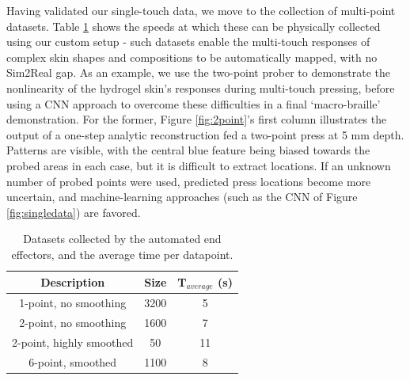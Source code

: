 Having validated our single-touch data, we move to the collection of multi-point datasets. Table \ref{tab:speeds} shows the speeds at which these can be physically collected using our custom setup - such datasets enable the multi-touch responses of complex skin shapes and compositions to be automatically mapped, with no Sim2Real gap. As an example, we use the two-point prober to demonstrate the nonlinearity of the hydrogel skin's responses during multi-touch pressing, before using a CNN approach to overcome these difficulties in a final `macro-braille' demonstration. For the former, Figure \ref{fig:2point}'s first column illustrates the output of a one-step analytic reconstruction fed a two-point press at 5 mm depth. Patterns are visible, with the central blue feature being biased towards the probed areas in each case, but it is difficult to extract locations. If an unknown number of probed points were used, predicted press locations become more uncertain, and machine-learning approaches (such as the CNN of Figure \ref{fig:singledata}) are favored.

\begin{table}[htbp]
    \centering
    \caption{Datasets collected by the automated end effectors, and the average time per datapoint.}
        \begin{tabular}{|c|c|c|}
        \hline
        \textbf{Description} & \textbf{Size} & \textbf{T$_{average}$ (s)} \\
        \hline
        1-point, no smoothing & 3200 & 5\\
        2-point, no smoothing & 1600 & 7\\
        2-point, highly smoothed & 50 & 11\\
        6-point, smoothed & 1100 & 8\\
        \hline
        \end{tabular}
    \label{tab:speeds}
\end{table}

